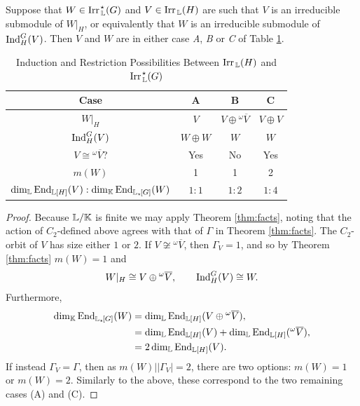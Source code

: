  \begin{thm}\label{thm:threeoptions}
    Suppose that $W \in \operatorname{Irr}_{\, {\mathbb L}}^{\hspace{0.1em} \star}(G)$ and $V \in \operatorname{Irr}_{\, {\mathbb L}}(H)$ are such that $V$ is an irreducible submodule of $W|_H$, or equivalently that $W$ is an irreducible submodule of $\operatorname{Ind}_H^G(V)$. Then $V$ and $W$ are in either case \emph{A}, \emph{B} or \emph{C} of Table \ref{tab:thewaysRHSsquare}.
 \end{thm}
 \begin{table}[h]
\caption{Induction and Restriction Possibilities Between $\operatorname{Irr}_{\, {\mathbb L}}(H)$ and $\operatorname{Irr}_{\, {\mathbb L}}^{\hspace{0.1em} \star}(G)$}
\label{tab:thewaysRHSsquare}
\begin{center}
\def\arraystretch{1.1}
\begin{tabular}{ c c c c }
    \toprule 
Case & \textbf{A} & \textbf{B} & \textbf{C} \\
\midrule
 $W|_H$ & $V$ & $V \oplus {}^{\omega}\overline{V}$ & $V \oplus V$ \\ 
 $\operatorname{Ind}_H^G(V)$ & $W \oplus W$ & $W$ & $W$\\ 
 $V \cong  {}^{\omega}\overline{V}$? & Yes & No & Yes \\
  $m(W)$ & 1 & 1 & 2 \\
  $\dim_{{\mathbb L}} \operatorname{End}_{{\mathbb L}[H]}(V) : \dim_{{\mathbb K}} \operatorname{End}_{{\mathbb L}_{\star \hspace{-0.1em}}[G]}(W)$ & $1:1$ & $1:2$ & $1:4$ \\ 
  \bottomrule
\end{tabular}
\end{center} 
\end{table}
 \begin{proof}
    Because ${\mathbb L} / {\mathbb K}$ is finite we may apply Theorem \ref{thm:facts}, noting that the action of $C_2$-defined above agrees with that of $\Gamma$ in Theorem \ref{thm:facts}. The $C_2$-orbit of $V$ has size either $1$ or $2$. If $V \not\cong  {}^{\omega}\overline{V}$, then $\Gamma_V = 1$, and so by Theorem \ref{thm:facts} $m(W) = 1$ and
    \[
        W|_H \cong V \oplus  {}^{\omega}\overline{V}, \qquad \operatorname{Ind}_{H}^G(V) \cong W.
    \]
    Furthermore,
    \begin{align*}
    \dim_{{\mathbb K}} \operatorname{End}_{{\mathbb L}_{\star \hspace{-0.1em}}[G]}(W) &= \dim_{{\mathbb L}} \operatorname{End}_{{\mathbb L}[H]}(V \oplus {}^{\omega}\overline{V}), \\
    &= \dim_{{\mathbb L}} \operatorname{End}_{{\mathbb L}[H]}(V) +  \dim_{{\mathbb L}} \operatorname{End}_{{\mathbb L}[H]}({}^{\omega}\overline{V}), \\
    &= 2 \dim_{{\mathbb L}} \operatorname{End}_{{\mathbb L}[H]}(V).
    \end{align*}
    If instead $\Gamma_V = \Gamma$, then as $m(W) | |\Gamma_V| = 2$, there are two options: $m(W) = 1$ or $m(W) = 2$. Similarly to the above, these correspond to the two remaining cases (A) and (C).
 \end{proof}

